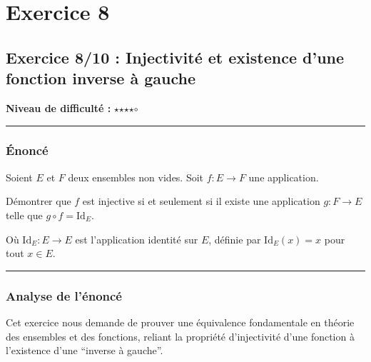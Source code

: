 \documentclass[12pt,a4paper]{report}
\begin{document}
\section{Exercice 8}
\subsection{Exercice 8/10 : Injectivité et existence d'une fonction
inverse à
gauche}\label{exercice-810-injectivituxe9-et-existence-dune-fonction-inverse-uxe0-gauche}

\textbf{Niveau de difficulté :} \(\star\)\(\star\)\(\star\)\(\star\)$\circ$

\begin{center}\rule{0.5\linewidth}{0.5pt}\end{center}

\subsubsection{Énoncé}\label{uxe9noncuxe9}

Soient \(E\) et \(F\) deux ensembles non vides. Soit \(f: E \to F\) une
application.

Démontrer que \(f\) est injective si et seulement si il existe une
application \(g: F \to E\) telle que \(g \circ f = \text{Id}_E\).

Où \(\text{Id}_E: E \to E\) est l'application identité sur \(E\),
définie par \(\text{Id}_E(x) = x\) pour tout \(x \in E\).

\begin{center}\rule{0.5\linewidth}{0.5pt}\end{center}

\subsubsection{Analyse de l'énoncé}\label{analyse-de-luxe9noncuxe9}

Cet exercice nous demande de prouver une équivalence fondamentale en
théorie des ensembles et des fonctions, reliant la propriété
d'injectivité d'une fonction à l'existence d'une ``inverse à gauche''.
\end{document}
